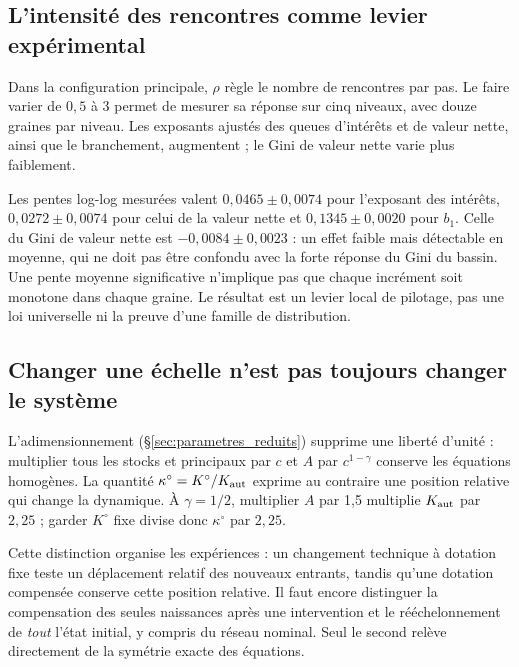 \subsection{L'intensité des rencontres comme levier expérimental}
Dans la configuration principale, $\rho$ règle le nombre de rencontres
par pas. Le faire varier de $0{,}5$ à $3$ permet de mesurer sa réponse
sur cinq niveaux, avec douze graines par niveau. Les exposants ajustés
des queues d'intérêts et de valeur nette, ainsi que le branchement,
augmentent ; le Gini de valeur nette varie plus faiblement.


Les pentes log-log mesurées valent $0{,}0465\pm0{,}0074$ pour
l'exposant des intérêts, $0{,}0272\pm0{,}0074$ pour celui de la valeur
nette et $0{,}1345\pm0{,}0020$ pour $b_1$. Celle du Gini de valeur nette
est $-0{,}0084\pm0{,}0023$ : un effet faible mais détectable en moyenne,
qui ne doit pas être confondu avec la forte réponse du Gini du bassin.
Une pente moyenne significative n'implique pas que chaque incrément soit
monotone dans chaque graine. Le résultat est un levier local de pilotage,
pas une loi universelle ni la preuve d'une famille de distribution.

\subsection{Changer une échelle n'est pas toujours changer le système}
L'adimensionnement (§\ref{sec:parametres_reduits}) supprime une liberté
d'unité : multiplier tous les stocks et principaux par $c$ et $A$ par
$c^{1-\gamma}$ conserve les équations homogènes. La quantité
$\kappa^\circ=K^\circ/K_{\rm aut}$ exprime au contraire une position
relative qui change la dynamique. À $\gamma=1/2$, multiplier $A$ par
1,5 multiplie $K_{\rm aut}$ par $2{,}25$ ; garder $K^\circ$ fixe
divise donc $\kappa^\circ$ par $2{,}25$.

Cette distinction organise les expériences : un changement technique
à dotation fixe teste un déplacement relatif des nouveaux entrants,
tandis qu'une dotation compensée conserve cette position relative.
Il faut encore distinguer la compensation des seules naissances après
une intervention et le rééchelonnement de \emph{tout} l'état initial,
y compris du réseau nominal. Seul le second relève directement de
la symétrie exacte des équations.

